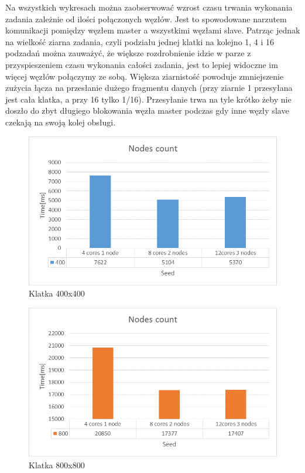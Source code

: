 \documentclass[a4paper]{article}
\begin{document}
Na wszystkich wykresach można zaobserwować wzrost czasu trwania wykonania zadania zależnie od ilości połączonych węzłów. Jest to spowodowane narzutem komunikacji pomiędzy węzłem master a wszystkimi węzłami slave. Patrząc jednak na wielkość ziarna zadania, czyli podziału jednej klatki na kolejno 1, 4 i 16 podzadań można zauważyć, że większe rozdrobnienie idzie w parze z przyspieszeniem czasu wykonania całości zadania, jest to lepiej widoczne im więcej węzłów połączymy ze sobą. Większa ziarnistość powoduje zmniejszenie zużycia łącza na przesłanie dużego fragmentu danych (przy ziarnie 1 przesyłana jest cała klatka, a przy 16 tylko 1/16). Przesyłanie trwa na tyle krótko żeby nie doszło do zbyt długiego blokowania węzła master podczas gdy inne węzły slave czekają na swoją kolej obsługi.

\begin{figure}[H]
    \centering
    \includegraphics[width=\textwidth]{4-1.png}
    \caption{Klatka 400x400}
    \label{fig:my_frac}
\end{figure}
\begin{figure}[H]
    \centering
    \includegraphics[width=\textwidth]{4-2.png}
    \caption{Klatka 800x800}
    \label{fig:my_frac}
\end{figure}
\end{document}
